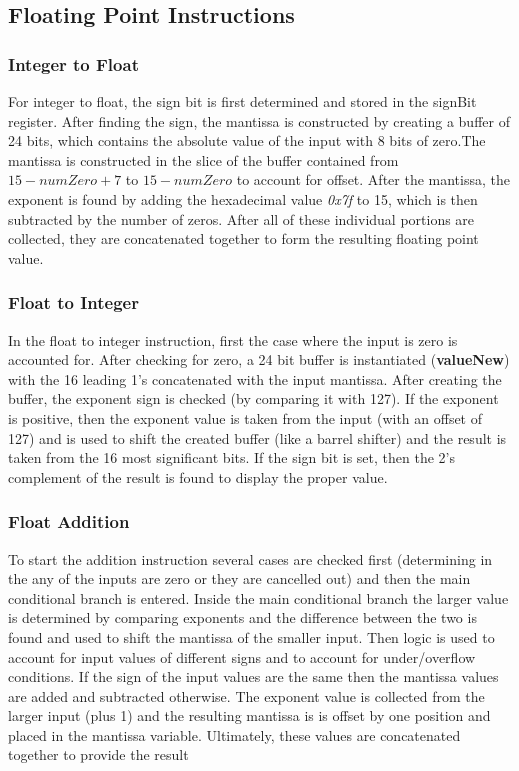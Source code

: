 \documentclass[conference]{IEEEtran}
\begin{document}
\subsection{Floating Point Instructions}
\subsubsection{Integer to Float}
For integer to float, the sign bit is first determined and stored in the signBit register. After 
finding the sign, the mantissa is constructed by creating a buffer of 24 bits, which contains
the absolute value of the input with 8 bits of zero.The mantissa is constructed in the slice 
of the buffer contained from \(15-numZero +7\) to \(15-numZero\) to account for offset.
After the mantissa, the exponent is found by adding the hexadecimal value \textit{0x7f} to 15, 
which is then subtracted by the number of zeros. After all of these individual portions are 
collected, they are concatenated together to form the resulting floating point value. 

\subsubsection{Float to Integer}
In the float to integer instruction, first the case where the input is zero is accounted for. After checking 
for zero, a 24 bit buffer is instantiated (\textbf{valueNew}) with the 16 leading 1's concatenated with the 
input mantissa. After creating the buffer, the exponent sign is checked (by comparing it with 127). If the
 exponent is positive, then the exponent value is taken from the input (with an offset of 127) and is used
 to shift the created buffer (like a barrel shifter) and the result is taken from the 16 most significant bits. If 
 the sign bit is set, then the 2's complement of the result is found to display the proper value. 
 
\subsubsection{Float Addition}
To start the addition instruction several cases are checked first (determining in the any of the inputs are 
zero or they are cancelled out) and then the main conditional branch is entered. Inside the main 
conditional branch the larger value is determined by comparing exponents and the difference between the
two is found and used to shift the mantissa of the smaller input. Then logic is used to account for input 
values of different signs and to account for under/overflow conditions. If the sign of the input values are
the same then the mantissa values are added and subtracted otherwise. The exponent value is collected
 from the larger input (plus 1) and the resulting mantissa is is offset by one position and placed in the 
 mantissa variable. Ultimately, these values are concatenated together to provide the result
\end{document}
